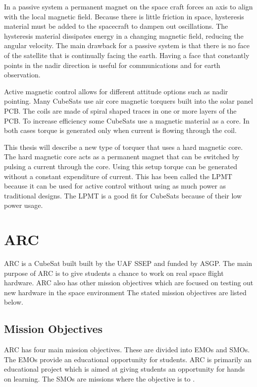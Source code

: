 In a passive system a permanent magnet on the space craft forces an axis to align with the local magnetic field. Because there is little friction in space, hysteresis material must be added to the spacecraft to dampen out oscillations. The hysteresis material dissipates energy in a changing magnetic field, reducing the angular velocity. The main drawback for a passive system is that there is no face of the satellite that is continually facing the earth. Having a face that constantly points in the nadir direction is useful for communications and for earth observation.

Active magnetic control allows for different attitude options such as nadir pointing. Many CubeSats use air core magnetic torquers built into the solar panel \ac{PCB}. The coils are made of spiral shaped traces in one or more layers of the \ac{PCB}. To increase efficiency some CubeSats use a magnetic material as a core. In both cases torque is generated only when current is flowing through the coil. 

This thesis will describe a new type of torquer that uses a hard magnetic core. The hard magnetic core acts as a permanent magnet that can be switched by pulsing a current through the core. Using this setup torque can be generated without a constant expenditure of current. This has been called the \acf{LPMT} because it can be used for active control without using as much power as traditional designs. The \ac{LPMT} is a good fit for CubeSats because of their low power usage.

\section{\acl{ARC}}

\ac{ARC} is a CubeSat built built by the \ac{UAF} \ac{SSEP} and funded by \ac{ASGP}. The main purpose of \ac{ARC} is to give students a chance to work on real space flight hardware. \ac{ARC} also has other mission objectives which are focused on testing out new hardware in the space environment The stated mission objectives are listed below.


\subsection{Mission Objectives}


\ac{ARC} has four main mission objectives. These are divided into \acp{EMO} and \acp{SMO}. The \acp{EMO} provide an educational opportunity for students. \ac{ARC} is primarily an educational project which is aimed at giving students an opportunity for hands on learning. The \acp{SMO} are missions where the objective is to  \cite{ArcCdr}.

